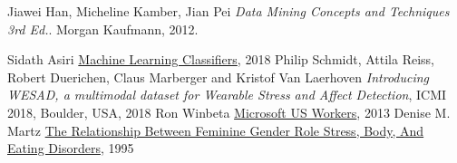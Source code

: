 \newpage

\begin{thebibliography}{9}
	Jiawei Han, Micheline Kamber, Jian Pei
	\textit{Data Mining Concepts and Techniques 3rd Ed.}. 
	Morgan Kaufmann, 2012.

	Sidath Asiri
	\href{https://towardsdatascience.com/machine-learning-classifiers-a5cc4e1b0623}{Machine Learning Classifiers},
	2018
	Philip Schmidt, Attila Reiss, Robert Duerichen, Claus Marberger and Kristof Van Laerhoven
	\textit{Introducing WESAD, a multimodal dataset for Wearable Stress and Affect Detection}, 
	ICMI 2018, Boulder, USA, 2018
	Ron Winbeta
	\href{https://www.onmsft.com/news/microsoft-us-workers-spend-7-hours-computer-day-average}{Microsoft US Workers},
	2013
	Denise M. Martz
	\href{https://onlinelibrary.wiley.com/doi/abs/10.1111/j.1471-6402.1995.tb00088.x}{The Relationship Between Feminine Gender Role Stress, Body, And Eating Disorders},
	1995
\end{thebibliography}
